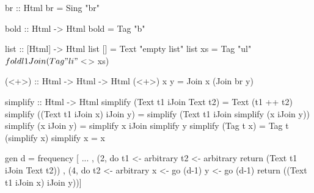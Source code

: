 \begin{code}
br :: Html
br = Sing "br"

bold :: Html -> Html
bold = Tag "b"

list :: [Html] -> Html
list []  = Text "empty list"
list xs  = Tag "ul" $ foldl1 Join (Tag "li" <$> xs)

(<+>) :: Html -> Html -> Html
(<+>) x y = Join x (Join br y)
\end{code} %



\begin{code}
simplify :: Html -> Html
simplify (Text t1 iJoin Text t2)
  = Text (t1 ++ t2)
simplify ((Text t1 iJoin x) iJoin y)
  = simplify (Text t1 iJoin simplify (x iJoin y))
simplify (x iJoin y)
  = simplify x iJoin simplify y
simplify (Tag t x)
  = Tag t (simplify x)
simplify x = x
\end{code}

\begin{code}
  gen d = frequency
    [ ...
    , (2, do  t1  <- arbitrary
              t2  <- arbitrary
              return (Text t1 iJoin Text t2))
    , (4, do  t2  <- arbitrary
              x   <- go (d-1)
              y   <- go (d-1)
              return ((Text t1 iJoin x) iJoin y))]
\end{code}%
